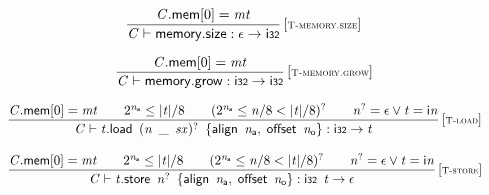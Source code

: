 \vspace{1ex}

$$
\begin{array}{@{}c@{}}\displaystyle
\frac{
{\mathit{C}}.\mathsf{mem}{}[0] = {\mathit{mt}}
}{
{\mathit{C}} \vdash \mathsf{memory.size} : \epsilon \rightarrow \mathsf{i{\scriptstyle32}}
} \, {[\textsc{\scriptsize T{-}memory.size}]}
\qquad
\end{array}
$$

$$
\begin{array}{@{}c@{}}\displaystyle
\frac{
{\mathit{C}}.\mathsf{mem}{}[0] = {\mathit{mt}}
}{
{\mathit{C}} \vdash \mathsf{memory.grow} : \mathsf{i{\scriptstyle32}} \rightarrow \mathsf{i{\scriptstyle32}}
} \, {[\textsc{\scriptsize T{-}memory.grow}]}
\qquad
\end{array}
$$

$$
\begin{array}{@{}c@{}}\displaystyle
\frac{
{\mathit{C}}.\mathsf{mem}{}[0] = {\mathit{mt}}
 \qquad
{2^{{\mathit{n}}_{{\mathsf{a}}}}} \leq {|{\mathit{t}}|} / 8
 \qquad
({2^{{\mathit{n}}_{{\mathsf{a}}}}} \leq {\mathit{n}} / 8 < {|{\mathit{t}}|} / 8)^?
 \qquad
{{\mathit{n}}^?} = \epsilon \lor {\mathit{t}} = {\mathsf{i}}{{\mathit{n}}}
}{
{\mathit{C}} \vdash {\mathit{t}}.\mathsf{load}~\,{({\mathit{n}}~\,\mathsf{\_}~\,{\mathit{sx}})^?}~\,\{ \begin{array}[t]{@{}l@{}}
\mathsf{align}~\,{\mathit{n}}_{{\mathsf{a}}},\; \mathsf{offset}~\,{\mathit{n}}_{{\mathsf{o}}} \}\end{array} : \mathsf{i{\scriptstyle32}} \rightarrow {\mathit{t}}
} \, {[\textsc{\scriptsize T{-}load}]}
\qquad
\end{array}
$$

$$
\begin{array}{@{}c@{}}\displaystyle
\frac{
{\mathit{C}}.\mathsf{mem}{}[0] = {\mathit{mt}}
 \qquad
{2^{{\mathit{n}}_{{\mathsf{a}}}}} \leq {|{\mathit{t}}|} / 8
 \qquad
({2^{{\mathit{n}}_{{\mathsf{a}}}}} \leq {\mathit{n}} / 8 < {|{\mathit{t}}|} / 8)^?
 \qquad
{{\mathit{n}}^?} = \epsilon \lor {\mathit{t}} = {\mathsf{i}}{{\mathit{n}}}
}{
{\mathit{C}} \vdash {\mathit{t}}.\mathsf{store}~\,{{\mathit{n}}^?}~\,\{ \begin{array}[t]{@{}l@{}}
\mathsf{align}~\,{\mathit{n}}_{{\mathsf{a}}},\; \mathsf{offset}~\,{\mathit{n}}_{{\mathsf{o}}} \}\end{array} : \mathsf{i{\scriptstyle32}}~\,{\mathit{t}} \rightarrow \epsilon
} \, {[\textsc{\scriptsize T{-}store}]}
\qquad
\end{array}
$$

